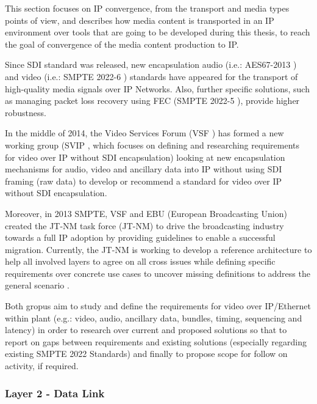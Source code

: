 This section focuses on IP convergence, from the transport and media types points of view, and describes how media content is transported in an IP environment over tools that are going to be developed during this thesis, to reach the goal of convergence of the media content production to IP. 

Since SDI standard was released, new encapsulation audio (i.e.: AES67-2013 \cite{AES}) and video (i.e.: SMPTE 2022-6 \cite{ST2022}) standards have appeared for the transport of high-quality media signals over IP Networks. Also, further specific solutions, such as managing packet loss recovery using FEC (SMPTE 2022-5 \cite{ST20225}), provide higher robustness.

In the middle of 2014, the Video Services Forum (VSF \cite{VSF}) has formed a new working group (SVIP \cite{SVIP}, which focuses on defining and researching requirements for video over IP without SDI encapsulation) looking at new encapsulation mechanisms for audio, video and ancillary data into IP without using SDI framing (raw data) to develop or recommend a standard for video over IP without SDI encapsulation.

Moreover, in 2013 SMPTE, VSF and EBU (European Broadcasting Union) created the JT-NM task force (JT-NM) to drive the broadcasting industry towards a full IP adoption by providing guidelines to enable a successful migration. Currently, the JT-NM is working to develop a reference architecture to help all involved layers to agree on all cross issues while defining specific requirements over concrete use cases to uncover missing definitions to address the general scenario \cite{jtnm}.

Both gropus aim to study and define the requirements for video over IP/Ethernet within plant (e.g.: video, audio, ancillary data, bundles, timing, sequencing and latency) in order to research over current and proposed solutions so that to report on gaps between requirements and existing solutions (especially regarding existing SMPTE 2022 Standards) and finally to propose scope for follow on activity, if required.

\subsubsection{Layer 2 - Data Link}

